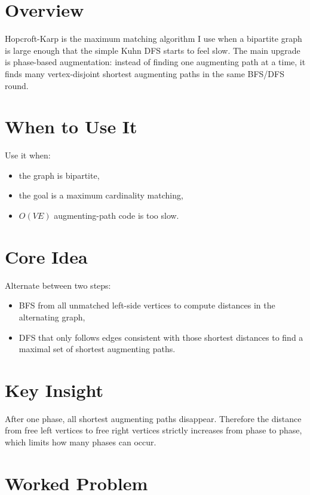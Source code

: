 \section*{Overview}

Hopcroft-Karp is the maximum matching algorithm I use when a bipartite graph is large enough that the simple Kuhn DFS
starts to feel slow. The main upgrade is phase-based augmentation: instead of finding one augmenting path at a time, it
finds many vertex-disjoint shortest augmenting paths in the same BFS/DFS round.

\section*{When to Use It}

Use it when:

\begin{itemize}
  \item the graph is bipartite,
  \item the goal is a maximum cardinality matching,
  \item \(O(VE)\) augmenting-path code is too slow.
\end{itemize}

\section*{Core Idea}

Alternate between two steps:

\begin{itemize}
  \item BFS from all unmatched left-side vertices to compute distances in the alternating graph,
  \item DFS that only follows edges consistent with those shortest distances to find a maximal set of shortest augmenting
  paths.
\end{itemize}

\section*{Key Insight}

After one phase, all shortest augmenting paths disappear. Therefore the distance from free left vertices to free right
vertices strictly increases from phase to phase, which limits how many phases can occur.

\section*{Worked Problem}

